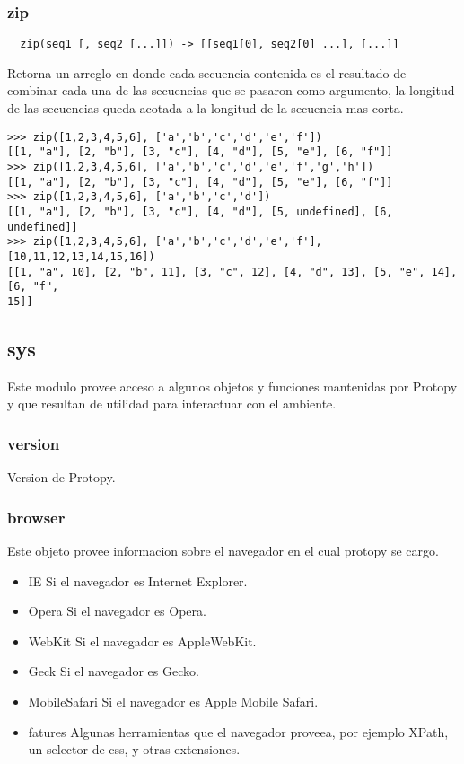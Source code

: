 \subsubsection*{zip}
\begin{verbatim}
  zip(seq1 [, seq2 [...]]) -> [[seq1[0], seq2[0] ...], [...]]
\end{verbatim}
Retorna un arreglo en donde cada secuencia contenida es el resultado de combinar
cada una de las secuencias que se pasaron como argumento, la longitud de las
secuencias queda acotada a la longitud de la secuencia mas corta.
\begin{lstlisting}[style=consola]
>>> zip([1,2,3,4,5,6], ['a','b','c','d','e','f'])
[[1, "a"], [2, "b"], [3, "c"], [4, "d"], [5, "e"], [6, "f"]]
>>> zip([1,2,3,4,5,6], ['a','b','c','d','e','f','g','h'])
[[1, "a"], [2, "b"], [3, "c"], [4, "d"], [5, "e"], [6, "f"]]
>>> zip([1,2,3,4,5,6], ['a','b','c','d'])
[[1, "a"], [2, "b"], [3, "c"], [4, "d"], [5, undefined], [6, undefined]]
>>> zip([1,2,3,4,5,6], ['a','b','c','d','e','f'], [10,11,12,13,14,15,16])
[[1, "a", 10], [2, "b", 11], [3, "c", 12], [4, "d", 13], [5, "e", 14], [6, "f",
15]]
\end{lstlisting}

\subsection{sys}
Este modulo provee acceso a algunos objetos y funciones mantenidas por Protopy y
que resultan de utilidad para interactuar con el ambiente.
\subsubsection*{version}
Version de Protopy.
\subsubsection*{browser}
Este objeto provee informacion sobre el navegador en el cual protopy se cargo.
\begin{itemize}
 \item{IE} Si el navegador es Internet Explorer.
 \item{Opera} Si el navegador es Opera.
 \item{WebKit} Si el navegador es AppleWebKit.
 \item{Geck} Si el navegador es Gecko.
 \item{MobileSafari} Si el navegador es Apple Mobile Safari.
 \item{fatures} Algunas herramientas que el navegador proveea, por ejemplo
XPath, un selector de css, y otras extensiones.
\end{itemize}

